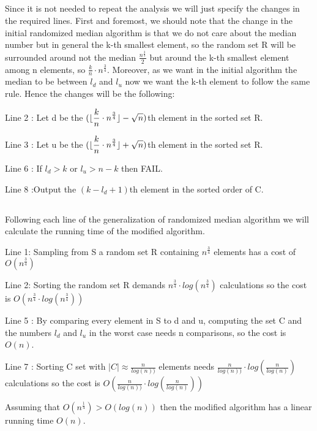 \documentclass[11pt]{537homework}
\DeclarePairedDelimiter\floor{\lfloor}{\rfloor}
\begin{document}
\subsection{}
Since it is not needed to repeat the analysis we will just specify the changes in the required lines. First and foremost, we should note that the change in the initial randomized median algorithm is that we do not care about the median number but in general the k-th smallest element, so the random set R will be surrounded around not the median $\displaystyle{\frac{n^{\frac{3}{4}}}{2}}$ but around the k-th smallest element among n elements, so $\displaystyle{\frac{k}{n} \cdot n^{\frac{3}{4}}}$. Moreover, as we want in the initial algorithm the median to be between $l_d$ and $l_u$ now we want the k-th element to follow the same rule. Hence the changes will be the following:
\begin{description}[font=$\bullet$]
\item Line 2 : Let d be the $(\floor{\displaystyle{\frac{k}{n} \cdot n^{\frac{3}{4}}}} - \sqrt{n})$th element in the sorted set R.
\item Line 3 : Let u be the $(\floor{\displaystyle{\frac{k}{n} \cdot n^{\frac{3}{4}}}} + \sqrt{n})$th element in the sorted set R.
\item Line 6 : If $l_d > k$ or $l_u > n - k$ then FAIL.
\item Line 8 :Output the $(k - l_d +1)$th element in the sorted order of C.
\end{description}
\subsection{}
Following each line of the generalization of randomized median algorithm we will calculate the running time of the modified algorithm. 
\begin{description}[font=$\bullet$]
\item Line 1: Sampling from S a random set R containing $n^{\frac{3}{4}}$ elements has a cost of $O(n^\frac{3}{4})$
\item Line 2: Sorting the random set R demands $n^{\frac{3}{4}}\cdot log(n^{\frac{3}{4}})$ calculations so the cost is $O(n^{\frac{3}{4}} \cdot log(n^{\frac{3}{4}}))$
\item Line 5 : By comparing every element in S to d and u, computing the set C and the numbers $l_d$ and $l_u$ in the worst case needs n comparisons, so the cost is $O(n)$.
\item Line 7 : Sorting C set with $|C| \approx \frac{n}{log(n))}$ elements needs $\frac{n}{log(n))} \cdot log(\frac{n}{log(n)}) $ calculations so the cost is $O(\frac{n}{log(n))} \cdot log(\frac{n}{log(n)}))$
\end{description}
Assuming that $O(n^{\frac{1}{4}}) > O(log(n))$ then the modified algorithm has a linear running time $O(n)$.
\end{document}

